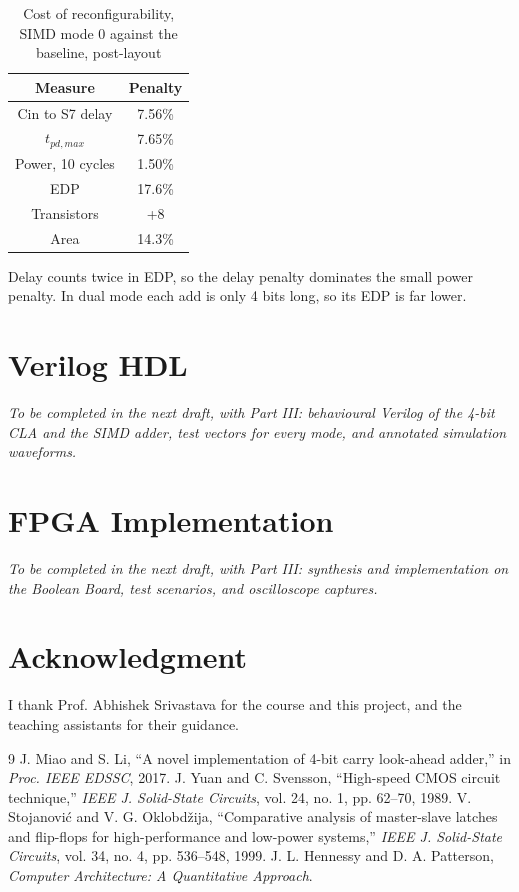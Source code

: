 \documentclass[conference,a4paper]{IEEEtran}
\begin{document}
\begin{table}[H]\centering\footnotesize
\caption{Cost of reconfigurability, SIMD mode 0 against the baseline, post-layout}
\begin{tabular}{|c|c|}\hline
Measure & Penalty \\ \hline
Cin to S7 delay & 7.56\% \\ \hline
$t_{pd,max}$ & 7.65\% \\ \hline
Power, 10 cycles & 1.50\% \\ \hline
EDP & 17.6\% \\ \hline
Transistors & +8 \\ \hline
Area & 14.3\% \\ \hline
\end{tabular}
\end{table}

Delay counts twice in EDP, so the delay penalty dominates the small power penalty. In dual mode each add is only 4 bits long, so its EDP is far lower.

\section{Verilog HDL}
\emph{To be completed in the next draft, with Part III: behavioural Verilog of the 4-bit CLA and the SIMD adder, test vectors for every mode, and annotated simulation waveforms.}

\section{FPGA Implementation}
\emph{To be completed in the next draft, with Part III: synthesis and implementation on the Boolean Board, test scenarios, and oscilloscope captures.}

\section*{Acknowledgment}
I thank Prof. Abhishek Srivastava for the course and this project, and the teaching assistants for their guidance.

\begin{thebibliography}{9}
 J. Miao and S. Li, ``A novel implementation of 4-bit carry look-ahead adder,'' in \emph{Proc. IEEE EDSSC}, 2017.
 J. Yuan and C. Svensson, ``High-speed CMOS circuit technique,'' \emph{IEEE J. Solid-State Circuits}, vol. 24, no. 1, pp. 62--70, 1989.
 V. Stojanovi\'c and V. G. Oklobd\v{z}ija, ``Comparative analysis of master-slave latches and flip-flops for high-performance and low-power systems,'' \emph{IEEE J. Solid-State Circuits}, vol. 34, no. 4, pp. 536--548, 1999.
 J. L. Hennessy and D. A. Patterson, \emph{Computer Architecture: A Quantitative Approach}.
\end{thebibliography}
\end{document}
